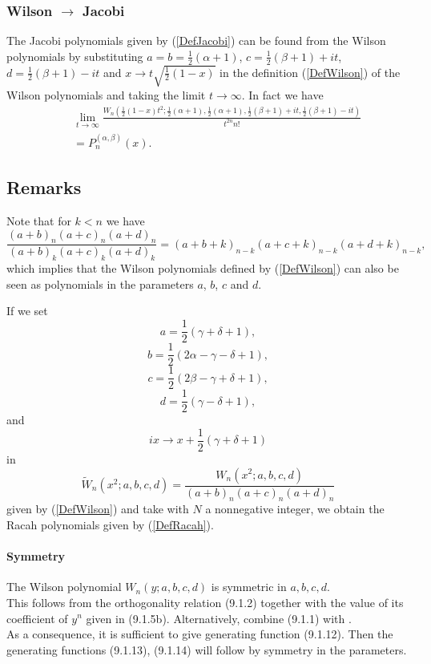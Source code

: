 \documentclass[envcountchap,graybox]{svmono}
\newcounter{rom}
\begin{document}
\subsubsection*{Wilson $\rightarrow$ Jacobi}
The Jacobi polynomials given by (\ref{DefJacobi}) can be found from the Wilson
polynomials by substituting $a=b=\frac{1}{2}(\alpha+1)$, $c=\frac{1}{2}(\beta+1)+it$,
$d=\frac{1}{2}(\beta+1)-it$ and $x\rightarrow t\sqrt{\frac{1}{2}(1-x)}$ in the
definition (\ref{DefWilson}) of the Wilson polynomials and taking the limit
$t\rightarrow\infty$. In fact we have
\begin{eqnarray}
& &\lim_{t\rightarrow\infty}\frac{W_n(\frac{1}{2}(1-x)t^2;\frac{1}{2}(\alpha+1),
\frac{1}{2}(\alpha+1),\frac{1}{2}(\beta+1)+it,\frac{1}{2}(\beta+1)-it)}{t^{2n}n!}\nonumber\\
& &{}=P_n^{(\alpha,\beta)}(x).
\end{eqnarray}

\subsection*{Remarks}
Note that for $k<n$ we have
$$\frac{(a+b)_n(a+c)_n(a+d)_n}{(a+b)_k(a+c)_k(a+d)_k}=(a+b+k)_{n-k}(a+c+k)_{n-k}(a+d+k)_{n-k},$$
which implies that the Wilson polynomials defined by (\ref{DefWilson}) can also be
seen as polynomials in the parameters $a$, $b$, $c$ and $d$.

\noindent
If we set
$$a=\textstyle\frac{1}{2}(\gamma+\delta+1),$$
$$b=\textstyle\frac{1}{2}(2\alpha-\gamma-\delta+1),$$
$$c=\textstyle\frac{1}{2}(2\beta-\gamma+\delta+1),$$
$$d=\textstyle\frac{1}{2}(\gamma-\delta+1),$$
and
$$ix\rightarrow x+\textstyle\frac{1}{2}(\gamma+\delta+1)$$
in
\begin{equation}
{\tilde{W}}_n(x^2;a,b,c,d)=\frac{W_n(x^2;a,b,c,d)}{(a+b)_n(a+c)_n(a+d)_n}
\end{equation}
given by (\ref{DefWilson}) and take
with $N$ a nonnegative integer, we obtain the Racah polynomials given by (\ref{DefRacah}).
\label{sec9.1}
%
\paragraph{\large\bf Symmetry}
The Wilson polynomial $W_n(y;a,b,c,d)$ is symmetric
in $a,b,c,d$.
\\
This follows from the orthogonality relation (9.1.2)
together with the value of its coefficient of $y^n$ given in (9.1.5b).
Alternatively, combine (9.1.1) with .\\
As a consequence, it is sufficient to give generating function (9.1.12). Then the generating
functions (9.1.13), (9.1.14) will follow by symmetry in the parameters.
%
\end{document}
